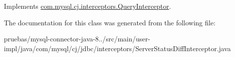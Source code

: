 Implements \mbox{\hyperlink{interfacecom_1_1mysql_1_1cj_1_1interceptors_1_1_query_interceptor_a1613f5491fdb4610d5727d60c904e7e2}{com.\+mysql.\+cj.\+interceptors.\+Query\+Interceptor}}.



The documentation for this class was generated from the following file\+:\begin{DoxyCompactItemize}
\item 
pruebas/mysql-\/connector-\/java-\/8../src/main/user-\/impl/java/com/mysql/cj/jdbc/interceptors/Server\+Status\+Diff\+Interceptor.\+java\end{DoxyCompactItemize}
